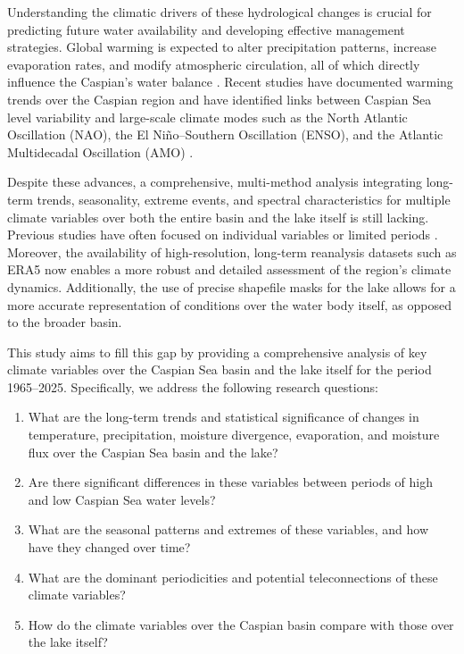 \documentclass[12pt,a4paper]{article}
\begin{document}
Understanding the climatic drivers of these hydrological changes is crucial for predicting future water availability and developing effective management strategies. Global warming is expected to alter precipitation patterns, increase evaporation rates, and modify atmospheric circulation, all of which directly influence the Caspian's water balance \citep{ipcc2021}. Recent studies have documented warming trends over the Caspian region \citep{shevchenko2017} and have identified links between Caspian Sea level variability and large-scale climate modes such as the North Atlantic Oscillation (NAO), the El Niño–Southern Oscillation (ENSO), and the Atlantic Multidecadal Oscillation (AMO) \citep{arpad2006,kislov2018}.

Despite these advances, a comprehensive, multi-method analysis integrating long-term trends, seasonality, extreme events, and spectral characteristics for multiple climate variables over both the entire basin and the lake itself is still lacking. Previous studies have often focused on individual variables or limited periods \citep{safarov2019,panin2007}. Moreover, the availability of high-resolution, long-term reanalysis datasets such as ERA5 \citep{hersbach2020} now enables a more robust and detailed assessment of the region's climate dynamics. Additionally, the use of precise shapefile masks for the lake allows for a more accurate representation of conditions over the water body itself, as opposed to the broader basin.

This study aims to fill this gap by providing a comprehensive analysis of key climate variables over the Caspian Sea basin and the lake itself for the period 1965–2025. Specifically, we address the following research questions:
\begin{enumerate}
    \item What are the long-term trends and statistical significance of changes in temperature, precipitation, moisture divergence, evaporation, and moisture flux over the Caspian Sea basin and the lake?
    \item Are there significant differences in these variables between periods of high and low Caspian Sea water levels?
    \item What are the seasonal patterns and extremes of these variables, and how have they changed over time?
    \item What are the dominant periodicities and potential teleconnections of these climate variables?
    \item How do the climate variables over the Caspian basin compare with those over the lake itself?
\end{enumerate}
\end{document}
